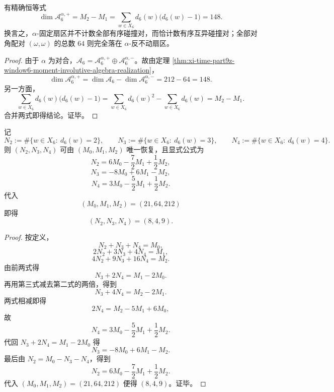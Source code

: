 \begin{corollary}\label{cor:xi-time-part9z-window6-fixed-sector-distinct-collision}
有精确恒等式
\[
\dim \mathcal A_6^{\alpha,+}
=
M_2-M_1
=
\sum_{w\in X_6}d_6(w)\bigl(d_6(w)-1\bigr)
=
148.
\]
换言之，\(\alpha\)-固定扇区并不计数全部有序碰撞对，而恰计数有序互异碰撞对；全部对角配对 \((\omega,\omega)\) 的总数 \(64\) 则完全落在 \(\alpha\)-反不动扇区。
\end{corollary}
\begin{proof}
由于 \(\alpha\) 为对合，\(\mathcal A_6=\mathcal A_6^{\alpha,+}\oplus \mathcal A_6^{\alpha,-}\)。故由定理 \ref{thm:xi-time-part9z-window6-moment-involutive-algebra-realization}，
\[
\dim \mathcal A_6^{\alpha,+}
=
\dim \mathcal A_6-\dim \mathcal A_6^{\alpha,-}
=
212-64
=
148.
\]
另一方面，
\[
\sum_{w\in X_6}d_6(w)\bigl(d_6(w)-1\bigr)
=
\sum_{w\in X_6}d_6(w)^2-\sum_{w\in X_6}d_6(w)
=
M_2-M_1.
\]
合并两式即得结论。证毕。
\end{proof}

\begin{theorem}\label{thm:xi-time-part9z-window6-histogram-from-three-moments}
记
\[
N_2:=\#\{w\in X_6:\ d_6(w)=2\},
\qquad
N_3:=\#\{w\in X_6:\ d_6(w)=3\},
\qquad
N_4:=\#\{w\in X_6:\ d_6(w)=4\}.
\]
则 \((N_2,N_3,N_4)\) 可由 \((M_0,M_1,M_2)\) 唯一恢复，且显式公式为
\[
N_2=6M_0-\frac72 M_1+\frac12 M_2,
\]
\[
N_3=-8M_0+6M_1-M_2,
\]
\[
N_4=3M_0-\frac52 M_1+\frac12 M_2.
\]
代入
\[
(M_0,M_1,M_2)=(21,64,212)
\]
即得
\[
(N_2,N_3,N_4)=(8,4,9).
\]
\end{theorem}
\begin{proof}
按定义，
\[
N_2+N_3+N_4=M_0,
\]
\[
2N_2+3N_3+4N_4=M_1,
\]
\[
4N_2+9N_3+16N_4=M_2.
\]
由前两式得
\[
N_3+2N_4=M_1-2M_0.
\]
再用第三式减去第二式的两倍，得到
\[
N_3+4N_4=M_2-2M_1.
\]
两式相减即得
\[
2N_4=M_2-5M_1+6M_0,
\]
故
\[
N_4=3M_0-\frac52M_1+\frac12M_2.
\]
代回
\(
N_3+2N_4=M_1-2M_0
\)
得
\[
N_3=-8M_0+6M_1-M_2.
\]
最后由 \(N_2=M_0-N_3-N_4\)，得到
\[
N_2=6M_0-\frac72M_1+\frac12M_2.
\]
代入 \((M_0,M_1,M_2)=(21,64,212)\) 便得 \((8,4,9)\)。证毕。
\end{proof}

